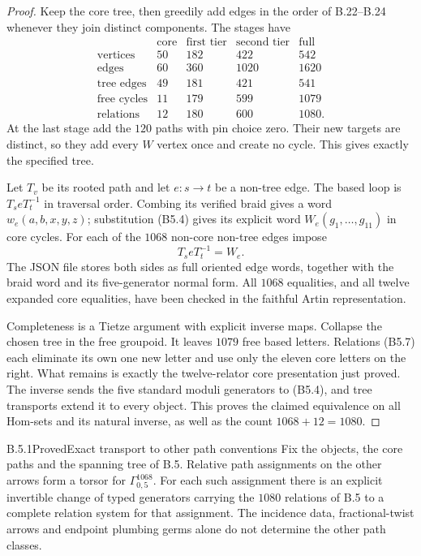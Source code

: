 \begin{proof}
Keep the core tree, then greedily add edges in the order of B.22--B.24
whenever they join distinct components.  The stages have
\[
\begin{array}{c|rrrr}
 &\text{core}&\text{first tier}&\text{second tier}&\text{full}\\ \hline
 \text{vertices}&50&182&422&542\\
 \text{edges}&60&360&1020&1620\\
 \text{tree edges}&49&181&421&541\\
 \text{free cycles}&11&179&599&1079\\
 \text{relations}&12&180&600&1080.
\end{array}
\]
At the last stage add the $120$ paths with pin choice zero.  Their new
targets are distinct, so they add every $W$ vertex once and create no
cycle.  This gives exactly the specified tree.

Let $T_v$ be its rooted path and let $e:s\to t$ be a non-tree edge.
The based loop is $T_s eT_t^{-1}$ in traversal order.  Combing its
verified braid gives a word $w_e(a,b,x,y,z)$; substitution (B5.4)
gives its explicit word $W_e(g_1,\ldots,g_{11})$ in core cycles.
For each of the $1068$ non-core non-tree edges impose
\[
                         T_s eT_t^{-1}=W_e.                 \tag{B5.7}
\]
The JSON file stores both sides as full oriented edge words, together
with the braid word and its five-generator normal form.  All $1068$
equalities, and all twelve expanded core equalities, have been checked
in the faithful Artin representation.

Completeness is a Tietze argument with explicit inverse maps.  Collapse
the chosen tree in the free groupoid.  It leaves $1079$ free based
letters.  Relations (B5.7) each eliminate its own one new letter and
use only the eleven core letters on the right.  What remains is exactly
the twelve-relator core presentation just proved.  The inverse sends
the five standard moduli generators to (B5.4), and tree transports
extend it to every object.  This proves the claimed equivalence on
all Hom-sets and its natural inverse, as well as the count
$1068+12=1080$.
\end{proof}

\begin{result}{B.5.1}{Proved}{Exact transport to other path conventions}
Fix the objects, the core paths and the spanning tree of B.5.
Relative path assignments on the other arrows form a torsor for
$\Gamma_{0,5}^{1068}$.  For each such assignment there is an explicit
invertible change of typed generators carrying the $1080$ relations
of B.5 to a complete relation system for that assignment.
The incidence data, fractional-twist arrows and endpoint plumbing
germs alone do not determine the other path classes.
\end{result}

